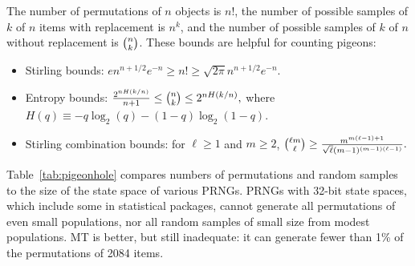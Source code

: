 \documentclass[graybox]{svmult}
\begin{document}
The number of permutations of $n$ objects is $n!$, the number of possible samples of $k$ of $n$ items
with replacement is $n^k$,  and the number of possible samples of $k$ of $n$ without replacement is $\tbinom{n}{k}$.
These bounds are helpful for counting pigeons:
\begin{itemize}
\item Stirling bounds: $ e n^{n+1/2} e^{-n} \ge n! \ge \sqrt{2 \pi} n^{n+1/2} e^{-n}.$
\item Entropy bounds:
$ \frac{2^{nH(k/n)}}{n+1} \le \tbinom{n}{k} \le 2^{nH(k/n)},$ where $H(q) \equiv -q \log_2(q) - (1-q) \log_2 (1-q)$.
\item Stirling combination bounds:
for $\ell \ge 1$ and $m \ge 2$, $ \tbinom{\ell m}{\ell } \ge \frac{m^{m(\ell-1)+1}}{\sqrt{\ell} (m-1)^{(m-1)(\ell-1)}}. $
\end{itemize}

Table~\ref{tab:pigeonhole} compares numbers of permutations and random samples to the size of
the state space of various PRNGs.
PRNGs with 32-bit state spaces, which include some in statistical packages, cannot generate all permutations of even small populations, nor all random samples of small size from modest populations.
MT is better, but still inadequate: it can generate fewer than 1\% of the permutations of 2084 items.
\end{document}
